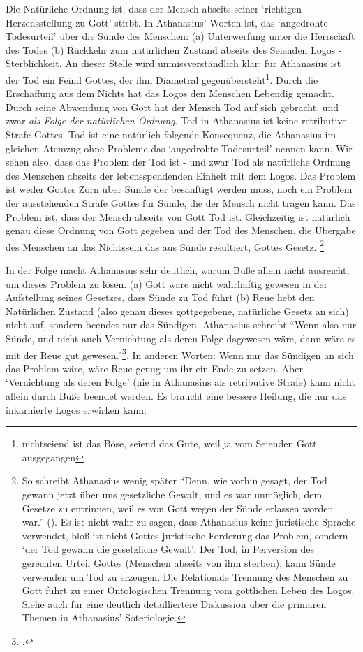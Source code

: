 Die Natürliche Ordnung ist, dass der Mensch abseits seiner `richtigen Herzensstellung zu Gott' stirbt.
In Athanasius' Worten ist, das `angedrohte Todesurteil' über die Sünde des Menschen: (a) Unterwerfung unter die Herrschaft des Todes (b) Rückkehr zum natürlichen Zustand abseits des Seienden Logos - Sterblichkeit.
An dieser Stelle wird unmissverständlich klar: für Athanasius ist der Tod ein Feind Gottes, der ihm Diametral gegenübersteht\footnote{nichtseiend ist das Böse, seiend das Gute, weil ja vom Seienden Gott ausgegangen}.
Durch die Erschaffung aus dem Nichts hat das Logos den Menschen Lebendig gemacht.
Durch seine Abwendung von Gott hat der Mensch Tod auf sich gebracht, und zwar \textit{als Folge der natürlichen Ordnung}.
Tod in Athanasius ist keine retributive Strafe Gottes.
Tod ist eine natürlich folgende Konsequenz, die Athanasius im gleichen Atemzug ohne Probleme das `angedrohte Todesurteil' nennen kann.
Wir sehen also, dass das Problem der Tod ist - und zwar Tod als natürliche Ordnung des Menschen abseits der lebensspendenden Einheit mit dem Logos.
Das Problem ist weder Gottes Zorn über Sünde der besänftigt werden muss, noch ein Problem der ausstehenden Strafe Gottes für Sünde, die der Mensch nicht tragen kann.
Das Problem ist, dass der Mensch abseits von Gott Tod ist.
Gleichzeitig ist natürlich genau diese Ordnung von Gott gegeben und der Tod des Menschen, die Übergabe des Menschen an das Nichtssein das aus Sünde resultiert, Gottes Gesetz.
\footnote{So schreibt Athanasius wenig später
``Denn, wie vorhin gesagt, der Tod gewann jetzt über uns gesetzliche Gewalt, und es war unmöglich, dem Gesetze zu entrinnen, weil es von Gott wegen der Sünde erlassen worden war.''
(\Cite[6]{de-incarnatione-verbi}).
Es ist nicht wahr zu sagen, dass Athanasius keine juristische Sprache verwendet, bloß ist nicht Gottes juristische Forderung das Problem, sondern `der Tod gewann die gesetzliche Gewalt':
Der Tod, in Perversion des gerechten Urteil Gottes (Menschen abseits von ihm sterben), kann Sünde verwenden um Tod zu erzeugen.
Die Relationale Trennung des Menschen zu Gott führt zu einer Ontologischen Trennung vom göttlichen Leben des Logos.
Siehe auch \Cite{deification-in-athanasius} für eine deutlich detailliertere Diskussion über die primären Themen in Athanasius' Soteriologie.}

In der Folge macht Athanasius sehr deutlich, warum Buße allein nicht ausreicht, um dieses Problem zu lösen.
(a) Gott wäre nicht wahrhaftig gewesen in der Aufstellung seines Gesetzes, dass Sünde zu Tod führt
(b) Reue hebt den Natürlichen Zustand (also genau dieses gottgegebene, natürliche Gesetz an sich) nicht auf, sondern beendet nur das Sündigen.
Athanasius schreibt ``Wenn also nur Sünde, und nicht auch Vernichtung als deren Folge dagewesen wäre, dann wäre es mit der Reue gut gewesen.''\Footcite[7]{de-incarnatione-verbi}.
In anderen Worten: Wenn nur das Sündigen an sich das Problem wäre, wäre Reue genug um ihr ein Ende zu setzen.
Aber `Vernichtung als deren Folge' (nie in Athanasius als retributive Strafe) kann nicht allein durch Buße beendet werden. Es braucht eine bessere Heilung, die nur das inkarnierte Logos erwirken kann:

